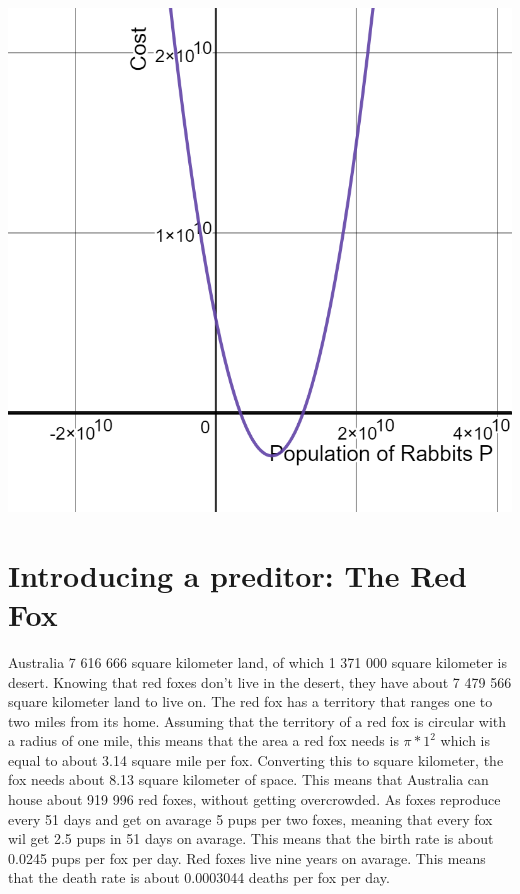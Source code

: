 \documentclass{article}
\begin{document}
\includegraphics[scale=0.3]{Pictures/CostH}
\\



\section{Introducing a preditor: The Red Fox}
Australia 7 616 666 square kilometer land, of which 1 371 000 square kilometer is desert. Knowing that red foxes don't live in the desert, they have about 7 479 566 square kilometer land to live on. The red fox has a territory that ranges one to two miles from its home. Assuming that the territory of a red fox is circular with a radius of one mile, this means that the area a red fox needs is $\pi*1^2$ which is equal to about 3.14 square mile per fox. Converting this to square kilometer, the fox needs about 8.13 square kilometer of space. This means that Australia can house about 919 996 red foxes, without getting overcrowded. As foxes reproduce every 51 days and get on avarage 5 pups per two foxes, meaning that every fox wil get 2.5 pups in 51 days on avarage. This means that the birth rate is about 0.0245 pups per fox per day. Red foxes live nine years on avarage. This means that the death rate is about 0.0003044 deaths per fox per day.
\end{document}
